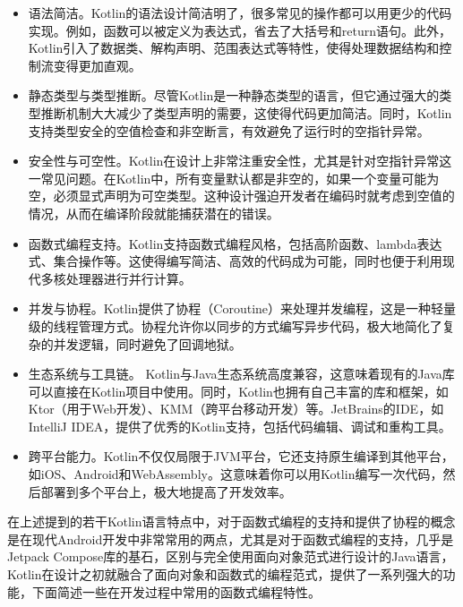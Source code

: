 \documentclass[main.tex]{subfiles}
\begin{document}
\begin{itemize}
    \item 语法简洁。Kotlin的语法设计简洁明了，很多常见的操作都可以用更少的代码实现。例如，函数可以被定义为表达式，省去了大括号和return语句。此外，Kotlin引入了数据类、解构声明、范围表达式等特性，使得处理数据结构和控制流变得更加直观。
    \item 静态类型与类型推断。尽管Kotlin是一种静态类型的语言，但它通过强大的类型推断机制大大减少了类型声明的需要，这使得代码更加简洁。同时，Kotlin支持类型安全的空值检查和非空断言，有效避免了运行时的空指针异常。
    \item 安全性与可空性。Kotlin在设计上非常注重安全性，尤其是针对空指针异常这一常见问题。在Kotlin中，所有变量默认都是非空的，如果一个变量可能为空，必须显式声明为可空类型。这种设计强迫开发者在编码时就考虑到空值的情况，从而在编译阶段就能捕获潜在的错误。
    \item 函数式编程支持。Kotlin支持函数式编程风格，包括高阶函数、lambda表达式、集合操作等。这使得编写简洁、高效的代码成为可能，同时也便于利用现代多核处理器进行并行计算。
    \item 并发与协程。Kotlin提供了协程（Coroutine）来处理并发编程，这是一种轻量级的线程管理方式。协程允许你以同步的方式编写异步代码，极大地简化了复杂的并发逻辑，同时避免了回调地狱。
    \item 生态系统与工具链。 Kotlin与Java生态系统高度兼容，这意味着现有的Java库可以直接在Kotlin项目中使用。同时，Kotlin也拥有自己丰富的库和框架，如Ktor（用于Web开发）、KMM（跨平台移动开发）等。JetBrains的IDE，如IntelliJ IDEA，提供了优秀的Kotlin支持，包括代码编辑、调试和重构工具。
    \item 跨平台能力。Kotlin不仅仅局限于JVM平台，它还支持原生编译到其他平台，如iOS、Android和WebAssembly。这意味着你可以用Kotlin编写一次代码，然后部署到多个平台上，极大地提高了开发效率。
\end{itemize}

在上述提到的若干Kotlin语言特点中，对于函数式编程的支持和提供了协程的概念是在现代Android开发中非常常用的两点，尤其是对于函数式编程的支持，几乎是Jetpack Compose库的基石，区别与完全使用面向对象范式进行设计的Java语言，Kotlin在设计之初就融合了面向对象和函数式的编程范式，提供了一系列强大的功能，下面简述一些在开发过程中常用的函数式编程特性。
\end{document}
